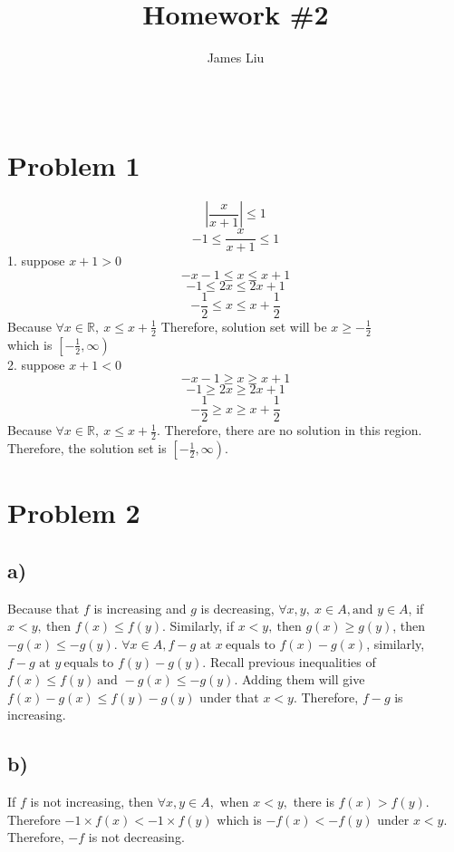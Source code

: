 \documentclass[a4paper,fleqn]{article}
\title{\textbf{Homework \#2 }}
\author{James Liu}
\date{\ }
\begin{document}
\maketitle


\section*{Problem 1}
    
    \[
        \left |\frac{x}{x+1} \right |\leqslant 1 
    \]\[
        -1 \leqslant \frac{x}{x+1} \leqslant 1 
    \]
    1. suppose \(x+1 > 0\)
    \[
    -x-1 \leqslant x \leqslant x+1    
    \]\[
    -1 \leqslant 2x \leqslant 2x+1    
    \]\[
    - \frac {1} {2} \leqslant x\leqslant x+\frac1 2
    \]
    Because 
    \(\forall x \in \mathbb{R},\  x \leqslant x + \frac 1 2\)
    Therefore, solution set will be \(x\geqslant -\frac 1 2\) \\
    which is \(\left[-\frac 1 2, \infty\right)\)\\
    2. suppose \(x+1 < 0\)
    \[
    -x-1 \geqslant x \geqslant x+1    
    \]\[
    -1 \geqslant 2x \geqslant 2x+1    
    \]\[
    - \frac {1} {2} \geqslant x\geqslant x+\frac1 2
    \]
    Because
    \(\forall x \in \mathbb{R},\  x \leqslant x + \frac 1 2\). Therefore, there are no solution in this region.
    Therefore, the solution set is \(\left[-\frac 1 2, \infty\right)\).

\section*{Problem 2}
    \subsection*{a)}
        Because that \(f\) is increasing and \(g\) is decreasing, \(\forall x,y, \ x\in A, \text{and } y\in A \),
        if \(x<y, \ \text{then }f(x)\leqslant f(y)\). Similarly, if \( x<y, \ \text{then } g(x)\geqslant g(y)\), then \(-g(x)\leqslant -g(y)\).
        \(\forall x \in A, f-g \text{ at }x \ \text{equals to } f(x)-g(x)\), similarly, \(f-g \text{ at }y \ \text{equals to } f(y)-g(y)\).
        Recall previous inequalities of \(f(x)\leqslant f(y)\ \text{and } -g(x)\leqslant -g(y) \). Adding them will give
        \(f(x)-g(x) \leqslant f(y)-g(y)\) under that \(x<y\). Therefore, \(f-g\) is increasing.
    \subsection*{b)}
        If \(f\) is not increasing, then  \( \forall x,y \in A, \text{ when } x<y,\) there is \(f(x)>f(y)\). \\ 
        Therefore \(-1 \times f(x)< -1 \times f(y)\) which is \(-f(x)<-f(y)\) under \(x<y\). Therefore, \(-f\) is not decreasing.
\end{document}
